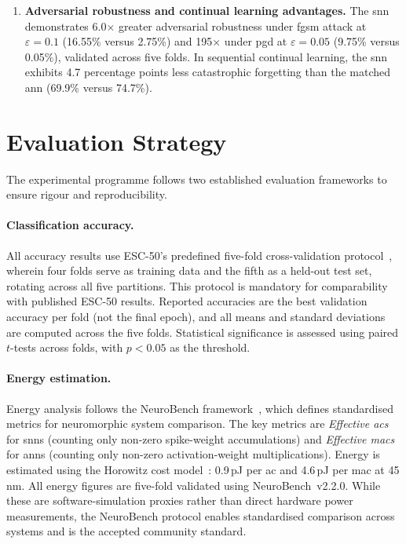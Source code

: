 \begin{enumerate}[label=\textbf{C\arabic*},leftmargin=2cm]
\item \textbf{Adversarial robustness and continual learning advantages.}
The \gls{snn} demonstrates 6.0$\times$ greater adversarial robustness under \gls{fgsm} attack at $\varepsilon = 0.1$ (16.55\% versus 2.75\%) and 195$\times$ under \gls{pgd} at $\varepsilon = 0.05$ (9.75\% versus 0.05\%), validated across five folds.
In sequential continual learning, the \gls{snn} exhibits 4.7 percentage points less catastrophic forgetting than the matched \gls{ann} (69.9\% versus 74.7\%).

\end{enumerate}

\section{Evaluation Strategy}
\label{sec:evaluation-strategy}

The experimental programme follows two established evaluation frameworks to ensure rigour and reproducibility.

\paragraph{Classification accuracy.}
All accuracy results use ESC-50's predefined five-fold cross-validation protocol~\citep{piczak2015esc50}, wherein four folds serve as training data and the fifth as a held-out test set, rotating across all five partitions.
This protocol is mandatory for comparability with published ESC-50 results.
Reported accuracies are the best validation accuracy per fold (not the final epoch), and all means and standard deviations are computed across the five folds.
Statistical significance is assessed using paired $t$-tests across folds, with $p < 0.05$ as the threshold.

\paragraph{Energy estimation.}
Energy analysis follows the NeuroBench framework~\citep{yik2025neurobench}, which defines standardised metrics for neuromorphic system comparison.
The key metrics are \textit{Effective \glspl{ac}} for \glspl{snn} (counting only non-zero spike-weight accumulations) and \textit{Effective \glspl{mac}} for \glspl{ann} (counting only non-zero activation-weight multiplications).
Energy is estimated using the Horowitz cost model~\citep{horowitz2014energy}: 0.9\,pJ per \gls{ac} and 4.6\,pJ per \gls{mac} at 45\,nm.
All energy figures are five-fold validated using NeuroBench~v2.2.0.
While these are software-simulation proxies rather than direct hardware power measurements, the NeuroBench protocol enables standardised comparison across systems and is the accepted community standard.

